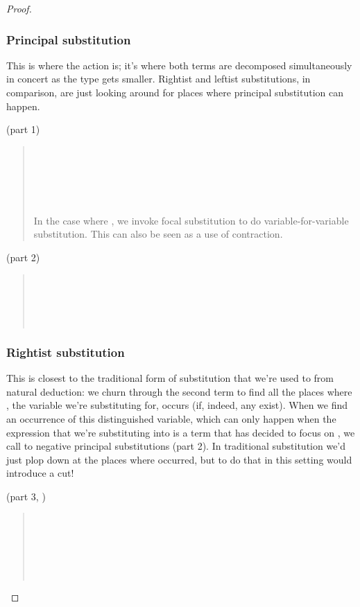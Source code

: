 \documentclass[acmtocl]{robtrans}\pdfoutput=1
\begin{document}
\begin{proof}
\subsubsection*{Principal substitution} 
This is where the action is; it's where both terms are decomposed
simultaneously in concert as the type gets smaller. Rightist and
leftist substitutions, in comparison, are just looking around for
places where principal substitution can happen.

\bigskip
\fbox{} (part 1)
\begin{quote}
\\
\\
\\
\\
\\


\medskip
In the case where , we invoke focal substitution 
to do variable-for-variable substitution. This can also be seen as 
a use of contraction.
\end{quote}

\medskip
\fbox{} (part 2)
\begin{quote}
\\
\\
\\
\\

\end{quote}

\subsubsection*{Rightist substitution} 
This is closest to the traditional form of substitution that we're
used to from natural deduction: we churn through the second term to
find all the places where , the variable we're substituting 
for, occurs (if, indeed, any exist). When we find an occurrence of
this distinguished variable, which can only happen when the expression
that we're substituting into is a term that has decided to focus on
, we call to negative principal substitutions (part 2).  In
traditional substitution we'd just plop  down at the places where
 occurred, but to do that in this setting would introduce a cut!

\bigskip
\fbox{} (part 3, )
\begin{quote}
\\
\\
\\
\\
\\


\end{quote}
\end{proof}
\end{document}
